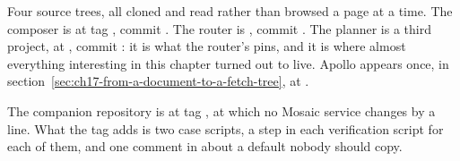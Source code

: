 Four source trees, all cloned and read rather than browsed a page at a time.
The composer is  at tag , commit
. The router is , commit . The
planner is a third project,  at , commit
: it is what the router's  pins, and it is where
almost everything interesting in this chapter turned out to live. Apollo appears
once, in section~\ref{sec:ch17-from-a-document-to-a-fetch-tree}, at
.

The companion repository is at tag , at which no Mosaic service
changes by a line. What the tag adds is two case scripts, a step in each
verification script for each of them, and one comment in
 about a default nobody should copy.








